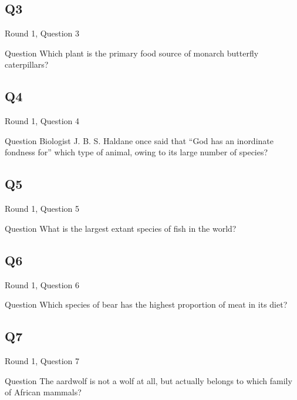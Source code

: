 \documentclass[11pt]{beamer}
\begin{document}
\subsection*{Q3}
\begin{frame}[t]{Round 1, Question 3}
\begin{block}{Question}
Which plant is the primary food source of monarch butterfly caterpillars?
\end{block}
\end{frame}
\subsection*{Q4}
\begin{frame}[t]{Round 1, Question 4}
\begin{block}{Question}
Biologist J. B. S. Haldane once said that ``God has an inordinate fondness for'' which type of animal, owing to its large number of species?
\end{block}
\end{frame}
\subsection*{Q5}
\begin{frame}[t]{Round 1, Question 5}
\begin{block}{Question}
What is the largest extant species of fish in the world?
\end{block}
\end{frame}
\subsection*{Q6}
\begin{frame}[t]{Round 1, Question 6}
\begin{block}{Question}
Which species of bear has the highest proportion of meat in its diet?
\end{block}
\end{frame}
\subsection*{Q7}
\begin{frame}[t]{Round 1, Question 7}
\begin{block}{Question}
The aardwolf is not a wolf at all, but actually belongs to which family of African mammals?
\end{block}
\end{frame}
\end{document}

